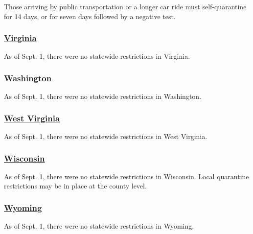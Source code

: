 Those arriving by public transportation or a longer car ride must
self-quarantine for 14 days, or for seven days followed by a negative
test.

\hypertarget{virginia}{%
\subsubsection{\texorpdfstring{\href{https://www.vdh.virginia.gov/coronavirus/frequently-asked-questions/u-s-travelers/}{Virginia}}{Virginia}}\label{virginia}}

As of Sept. 1, there were no statewide restrictions in Virginia.

\hypertarget{washington}{%
\subsubsection{\texorpdfstring{\href{https://www.experiencewa.com/articles/date-coronavirus-travel-advisory}{Washington}}{Washington}}\label{washington}}

As of Sept. 1, there were no statewide restrictions in Washington.

\hypertarget{west-virginia}{%
\subsubsection{\texorpdfstring{\href{https://wvtourism.com/travel-alert/}{West
Virginia}}{West Virginia}}\label{west-virginia}}

As of Sept. 1, there were no statewide restrictions in West Virginia.

\hypertarget{wisconsin}{%
\subsubsection{\texorpdfstring{\href{https://www.dhs.wisconsin.gov/covid-19/travel.htm}{Wisconsin}}{Wisconsin}}\label{wisconsin}}

As of Sept. 1, there were no statewide restrictions in Wisconsin. Local
quarantine restrictions may be in place at the county level.

\hypertarget{wyoming}{%
\subsubsection{\texorpdfstring{\href{https://health.wyo.gov/publichealth/infectious-disease-epidemiology-unit/disease/novel-coronavirus/covid-19-orders-and-guidance/}{Wyoming}}{Wyoming}}\label{wyoming}}

As of Sept. 1, there were no statewide restrictions in Wyoming.

